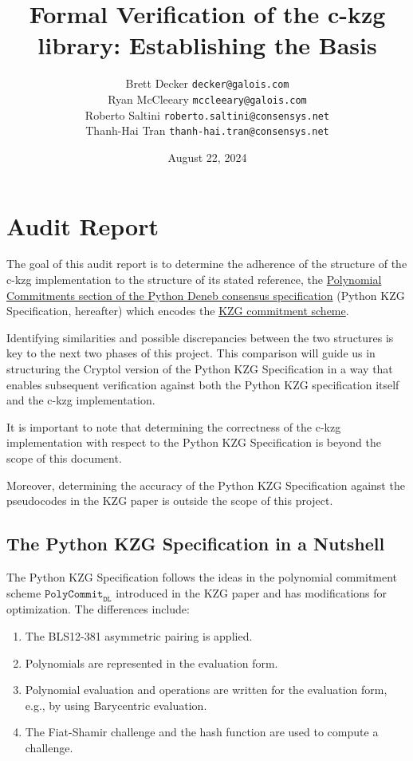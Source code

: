\documentclass[12pt]{galois-whitepaper}
\author{Brett Decker \texttt{decker@galois.com}\\
Ryan McCleeary \texttt{mccleeary@galois.com}\\
Roberto Saltini \texttt{roberto.saltini@consensys.net}\\
Thanh-Hai Tran \texttt{thanh-hai.tran@consensys.net}
}
\title{Formal Verification of the c-kzg library: Establishing the Basis}
\date{August 22, 2024}
\begin{document}
\maketitle

\vspace*{2cm}

\newpage
\tableofcontents
\newpage

\section{Audit Report}
The goal of this audit report is to determine the adherence of the structure of the c-kzg implementation to the structure of its stated reference,
the \href{https://github.com/ethereum/consensus-specs/blob/dev/specs/deneb/polynomial-commitments.md}{Polynomial Commitments section of the Python Deneb consensus specification} (Python KZG Specification, hereafter) which encodes the \href{https://www.iacr.org/archive/asiacrypt2010/6477178/6477178.pdf}{KZG commitment scheme}.

Identifying similarities and possible discrepancies between the two structures is key to the next two phases of this project.
This comparison will guide us in structuring the Cryptol version of the Python KZG Specification in a way that enables subsequent verification against both the Python KZG specification itself and the c-kzg implementation.

It is important to note that determining the correctness of the c-kzg implementation with respect to the Python KZG Specification is beyond the scope of this document.

Moreover, determining the accuracy of the Python KZG Specification against the pseudocodes in the KZG paper is outside the scope of this project.

\subsection{The Python KZG Specification in a Nutshell}

The Python KZG Specification follows the ideas in the polynomial commitment scheme $\texttt{PolyCommit}_{\texttt{DL}}$ introduced in the KZG paper and has modifications for optimization.
The differences include:
\begin{enumerate}
    \item The BLS12-381 asymmetric pairing is applied.
    \item Polynomials are represented in the evaluation form.
    \item Polynomial evaluation and operations are written for the evaluation form, e.g., by using Barycentric evaluation.
    \item The Fiat-Shamir challenge and the hash function are used to compute a challenge.
\end{enumerate}
\end{document}
